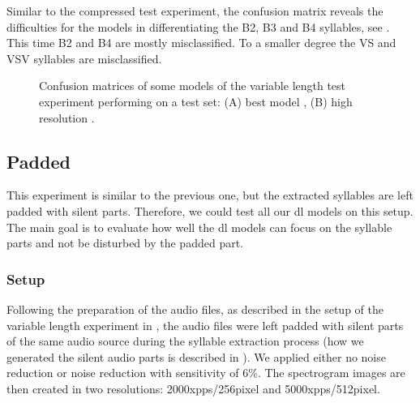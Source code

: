 Similar to the compressed test experiment, the confusion matrix reveals the difficulties for the models in differentiating the B2, B3 and B4 syllables, see .
This time B2 and B4 are mostly misclassified. To a smaller degree the VS and VSV syllables are misclassified.

\begin{figure}[!htb]
  \centering
  \caption{Confusion matrices of some models of the variable length test experiment performing on a test set: (A) best model \cite{nn_lstm_sct_vl_xpps4000_h300_hog_100}, (B) high resolution \cite{nn_lstm_sct_vl_xpps5000_h512_hog_100}.}
  \label{fig:confusion_sct_vl}
\end{figure}

\subsection{Padded}
This experiment is similar to the previous one, but the extracted syllables are left padded with silent parts. Therefore, we could test all our \gls{dl} models on this setup. The main goal is to evaluate how well the \gls{dl} models can focus on the syllable parts and not be disturbed by the padded part.

\subsubsection{Setup}
Following the preparation of the audio files, as described in the setup of the variable length experiment in , the audio files were left padded with silent parts of the same audio source during the syllable extraction process (how we generated the silent audio parts is described in ). We applied either no noise reduction or noise reduction with sensitivity of 6\%. The spectrogram images are then created in two resolutions: 2000\gls{xpps}/256pixel and 5000\gls{xpps}/512pixel.
\clearpage
